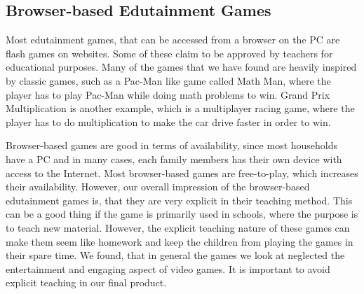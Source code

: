 \subsection{Browser-based Edutainment Games}
Most edutainment games, that can be accessed from a browser on the PC are flash games on websites.
Some of these claim to be approved by teachers for educational purposes.
Many of the games that we have found are heavily inspired by classic games, such as a Pac-Man like game called Math Man, where the player has to play Pac-Man while doing math problems to win.\cite{mathman}
Grand Prix Multiplication is another example, which is a multiplayer racing game, where the player has to do multiplication to make the car drive faster in order to win.\cite{grandprix}\newline

Browser-based games are good in terms of availability, since most households have a PC and in many cases, each family members has their own device with access to the Internet. Most browser-based games are free-to-play, which increases their availability. However, our overall impression of the browser-based edutainment games is, that they are very explicit in their teaching method. This can be a good thing if the game is primarily used in schools, where the purpose is to teach new material. However, the explicit teaching nature of these games can make them seem like homework and keep the children from playing the games in their spare time. We found, that in general the games we look at neglected the entertainment and engaging aspect of video games. It is important to avoid explicit teaching in our final product.